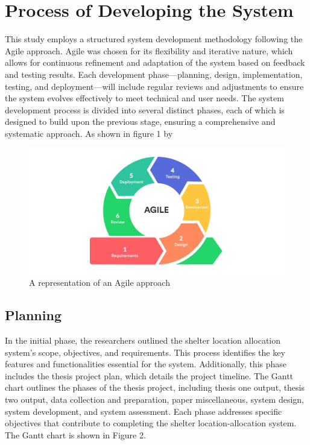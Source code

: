 \section{Process of Developing the System}
This study employs a structured system development methodology following the Agile approach. Agile was chosen for its flexibility and iterative nature, which allows for continuous refinement and adaptation of the system based on feedback and testing results. Each development phase—planning, design, implementation, testing, and deployment—will include regular reviews and adjustments to ensure the system evolves effectively to meet technical and user needs.
The system development process is divided into several distinct phases, each of which is designed to build upon the previous stage, ensuring a comprehensive and systematic approach. As shown in figure 1 by 

\begin{figure}[h!]
	\caption{A representation of an Agile approach}
	\centering
	\includegraphics[width=\textwidth]{AGILE}
\end{figure}

\subsection{Planning}

	In the initial phase, the researchers outlined the shelter location allocation system's scope, objectives, and requirements. This process identifies the key features and functionalities essential for the system. Additionally, this phase includes the thesis project plan, which details the project timeline.
	The Gantt chart outlines the phases of the thesis project, including thesis one output, thesis two output, data collection and preparation, paper miscellaneous, system design, system development, and system assessment. Each phase addresses specific objectives that contribute to completing the shelter location-allocation system. The Gantt chart is shown in Figure 2.
	
